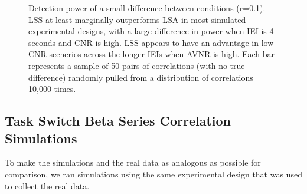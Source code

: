\documentclass[10pt,letterpaper]{article}
\begin{document}
\begin{figure}[H]
  \centering


  \caption{
    Detection power of a small difference between conditions (r=0.1).
    LSS at least marginally outperforms LSA in most simulated experimental
    designs, with a large difference in power when IEI is 4 seconds and
    CNR is high.
    LSS appears to have an advantage in low CNR scenerios across the longer IEIs
    when AVNR is high.
    Each bar represents a sample of 50 pairs of correlations (with no true difference)
    randomly pulled from a distribution of correlations 10,000 times.
  }
  \label{fig:res_sim_smalldiff}
\end{figure}

\subsection*{Task Switch Beta Series Correlation Simulations}
\label{results:bsc-taskswitch-simulations}

To make the simulations and the real data as analogous as possible
for comparison, we ran simulations using the same experimental design
that was used to collect the real data.
\end{document}
